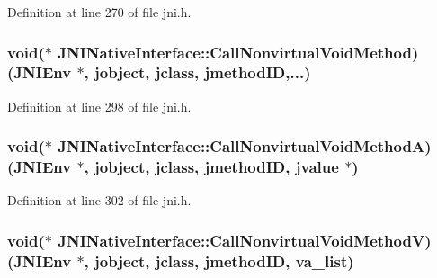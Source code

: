 Definition at line 270 of file jni.\-h.

\hypertarget{struct_j_n_i_native_interface_a0ba310c330f22fc2adec0291a36ace32}{
\subsubsection[{Call\-Nonvirtual\-Void\-Method}]{\setlength{\rightskip}{0pt plus 5cm}void($\ast$ J\-N\-I\-Native\-Interface\-::\-Call\-Nonvirtual\-Void\-Method)({\bf J\-N\-I\-Env} $\ast$, {\bf jobject}, {\bf jclass}, {\bf jmethod\-I\-D},...)}}\label{struct_j_n_i_native_interface_a0ba310c330f22fc2adec0291a36ace32}


Definition at line 298 of file jni.\-h.

\hypertarget{struct_j_n_i_native_interface_a76116656c90843ada0c2a18fdcfa794a}{
\subsubsection[{Call\-Nonvirtual\-Void\-Method\-A}]{\setlength{\rightskip}{0pt plus 5cm}void($\ast$ J\-N\-I\-Native\-Interface\-::\-Call\-Nonvirtual\-Void\-Method\-A)({\bf J\-N\-I\-Env} $\ast$, {\bf jobject}, {\bf jclass}, {\bf jmethod\-I\-D}, {\bf jvalue} $\ast$)}}\label{struct_j_n_i_native_interface_a76116656c90843ada0c2a18fdcfa794a}


Definition at line 302 of file jni.\-h.

\hypertarget{struct_j_n_i_native_interface_a97dd0d756b978ab0f3f55a671a163ffa}{
\subsubsection[{Call\-Nonvirtual\-Void\-Method\-V}]{\setlength{\rightskip}{0pt plus 5cm}void($\ast$ J\-N\-I\-Native\-Interface\-::\-Call\-Nonvirtual\-Void\-Method\-V)({\bf J\-N\-I\-Env} $\ast$, {\bf jobject}, {\bf jclass}, {\bf jmethod\-I\-D}, va\-\_\-list)}}\label{struct_j_n_i_native_interface_a97dd0d756b978ab0f3f55a671a163ffa}


